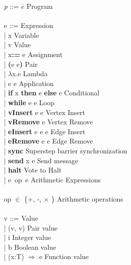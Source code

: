 \begin{frame}
  \begin{tiny}
  \begin{roman-grammar}
    \textit{p} ::= $\overline{e}$  \>\>\>\>\> Program \\
\ \\
  e ::= \>\>\>\>\> Expression \\
  \ttab | x \>\>\>\>\> Variable \\
  \ttab | v  \>\>\>\>\> Value \\
  \ttab | x\textbf{:=} e \>\>\>\>\> Assignment \\
  \ttab | \textbf{(}e e\textbf{)} \>\>\>\>\> Pair \\
  \ttab | $\lambda$x.e \>\>\>\>\> Lambda \\
  \ttab | e e \>\>\>\>\> Application \\
  \ttab |  \textbf{if} x \textbf{then} e \textbf{else} e \>\>\>\>\> Conditional \\
  \ttab |  \textbf{while} e e \>\>\>\>\> Loop \\
  \ttab |  \textbf{vInsert} e e \>\>\>\>\> Vertex Insert \\
  \ttab |  \textbf{vRemove} e  \>\>\>\>\> Vertex Remove \\
  \ttab |  \textbf{eInsert} e e e  \>\>\>\>\> Edge Insert \\
  \ttab |  \textbf{eRemove} e e \>\>\>\>\> Edge Remove \\
  \ttab |  \textbf{sync} \>\>\>\>\> Superstep barrier synchronization\\
  \ttab |  \textbf{send} x e \>\>\>\>\> Send message\\
  \ttab |  \textbf{halt} \>\>\>\>\> Vote to Halt \\
  \ttab |  e\ op\ e \>\>\>\>\> Arithmetic Expressions \\  
\ \\
  op $\in$ \{+, -, $\times$ \} \>\>\>\>  Arithmetic operations \\
\ \\    
  v ::= \>\>  Value \\
    \ttab | (v, v) \>\>\>\>  Pair value \\
    \ttab | i \>\>\>\>  Integer value\\
    \ttab | b \>\>\>\>  Boolean value\\
    \ttab | (x:T) $\Rightarrow$ e \>\>\>\>  Function value\\
    

\end{roman-grammar}
\end{tiny}    
\end{frame}

